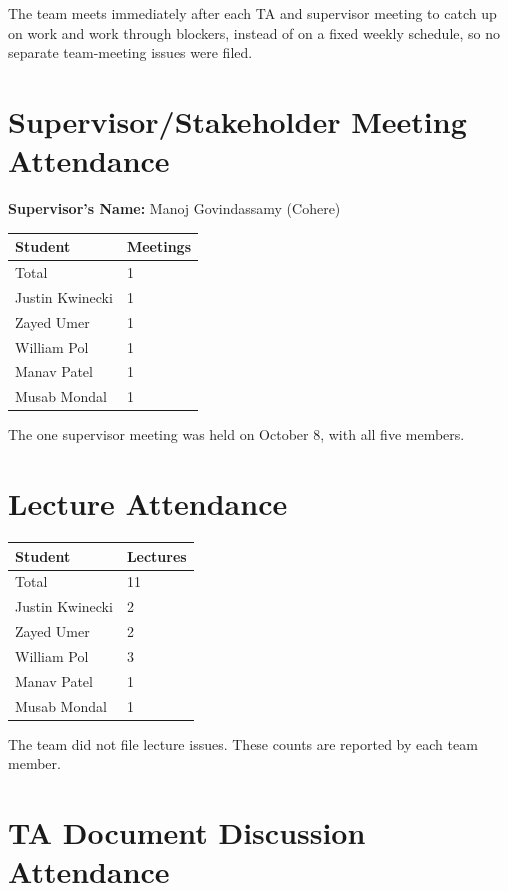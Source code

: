 \documentclass{article}
\begin{document}
The team meets immediately after each TA and supervisor meeting to catch up
on work and work through blockers, instead of on a fixed weekly schedule, so no
separate team-meeting issues were filed.

\section{Supervisor/Stakeholder Meeting Attendance}

\noindent \textbf{Supervisor's Name: } Manoj Govindassamy (Cohere)

\begin{table}[H]
\centering
\begin{tabular}{ll}
\toprule
\textbf{Student} & \textbf{Meetings}\\
\midrule
Total & 1\\
Justin Kwinecki & 1\\
Zayed Umer & 1\\
William Pol & 1\\
Manav Patel & 1\\
Musab Mondal & 1\\
\bottomrule
\end{tabular}
\end{table}

The one supervisor meeting was held on October 8, with all five members.

\section{Lecture Attendance}

\begin{table}[H]
\centering
\begin{tabular}{ll}
\toprule
\textbf{Student} & \textbf{Lectures}\\
\midrule
Total & 11\\
Justin Kwinecki & 2\\
Zayed Umer & 2\\
William Pol & 3\\
Manav Patel & 1\\
Musab Mondal & 1\\
\bottomrule
\end{tabular}
\end{table}

The team did not file lecture issues. These counts are reported by each
team member.

\section{TA Document Discussion Attendance}
\end{document}
